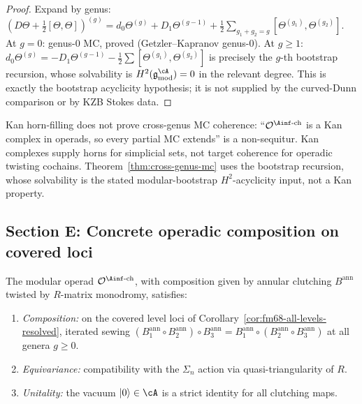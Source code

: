 \begin{proof}
Expand by genus:
$(D\Theta + \tfrac{1}{2}[\Theta,\Theta])^{(g)}
= d_0 \Theta^{(g)} + D_1 \Theta^{(g-1)}
+ \tfrac{1}{2}\sum_{g_1+g_2=g}[\Theta^{(g_1)}, \Theta^{(g_2)}]$.
At $g=0$: genus-$0$ MC, proved (Getzler--Kapranov genus-$0$).
At $g \ge 1$: $d_0\Theta^{(g)} = -D_1\Theta^{(g-1)}
- \tfrac{1}{2}\sum[\Theta^{(g_1)},\Theta^{(g_2)}]$ is precisely the
$g$-th bootstrap recursion, whose solvability is
$H^2(\mathfrak{g}^{\cA}_{\mathrm{mod}}) = 0$ in the relevant
degree. This is exactly the bootstrap acyclicity hypothesis; it is
not supplied by the curved-Dunn comparison or by KZB Stokes data.
\end{proof}

\begin{remark}
\label{rem:kan-replacement}
Kan horn-filling does not prove cross-genus MC coherence:
``$\mathcal{O}^{\Ainf\text{-ch}}$ is a Kan complex in operads, so
every partial MC extends'' is a non-sequitur. Kan complexes supply
horns for simplicial sets, not target coherence for operadic twisting
cochains. Theorem~\ref{thm:cross-genus-mc} uses the bootstrap
recursion, whose solvability is the stated modular-bootstrap
\(H^2\)-acyclicity input, not a Kan property.
\end{remark}

\subsection{Section E: Concrete operadic composition on covered loci}
\label{subsec:concrete-composition}

\begin{theorem}
\label{thm:concrete-operadic-composition}
The modular operad $\mathcal{O}^{\Ainf\text{-ch}}$, with
composition given by annular clutching $B^{\mathrm{ann}}$ twisted
by $R$-matrix monodromy, satisfies:
\begin{enumerate}[label=\textup{(\roman*)}]
\item \emph{Composition:} on the covered level loci of
Corollary~\ref{cor:fm68-all-levels-resolved}, iterated sewing
 $(B^{\mathrm{ann}}_1 \circ B^{\mathrm{ann}}_2) \circ
 B^{\mathrm{ann}}_3 = B^{\mathrm{ann}}_1 \circ
 (B^{\mathrm{ann}}_2 \circ B^{\mathrm{ann}}_3)$ at all genera
 $g \ge 0$.
\item \emph{Equivariance:} compatibility with the $\Sigma_n$ action
 via quasi-triangularity of $R$.
\item \emph{Unitality:} the vacuum $|0\rangle \in \cA$ is a strict
 identity for all clutching maps.
\end{enumerate}
\end{theorem}

